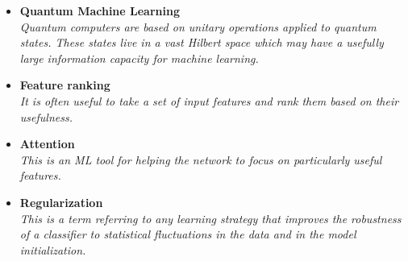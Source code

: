 \documentclass[12pt,letterpaper]{article}
\begin{document}
\begin{itemize}
\begin{itemize}
\begin{itemize}
				\\\textit{Instead of learning to distinguish different types of examples, the goal of reinforcement learning is to learn a strategy (policy).  The prototypical example of reinforcement learning in learning a strategy to play video games using some kind of score as a feedback during the learning.}
				\item \textbf{Quantum Machine Learning}~\cite{Kangaziankangazi:2026xis,Sawaika:2026qxa,Addepalli:2026hwb,Rodrigo:2026atx,Argenton:2026zxr,Knipfer:2026kng,Islam:2026baq,Le:2026xub,Rodrigo:2026xom,Napolitano:2025mhl,MartinezdeLejarzaSamper:2025wuy,Odagiu:2025ifc,Okawa:2025ley,AitHaddou:2025fam,Bal:2025yxb,Maier:2025ppr,Ali:2025gni,Le:2025swl,Pyretzidis:2025stx,Rodriguez-Grasa:2025ggh,Casals:2025cuc,Yin:2025hnt,Le:2025swl,Duffy:2025hsl,Bal:2025ydm,Hammad:2024dsn,Scott:2024txs,Yang:2024bqw,Nelakurti:2024xol,Zhang:2024ebl,Lazar:2024luq,Chen:2024rna,Hoque:2023zjt,Hammad:2023wme,Rehm:2023ovj,Schuhmacher:2023pro,Wozniak:2023xbe,Rousselot:2023pcj,Duckett:2022ccc,Araz:2022zxk,Peixoto:2022zzk,Alvi:2022fkk,Delgado:2022aty,Araz:2022haf,Abel:2022lqr,Gianelle:2022unu,Ngairangbam:2021yma,Kim:2021wrr,Bravo-Prieto:2021ehz,Araz:2021ifk,Belis:2021zqi,Wu:2021xsj,Heredge:2021vww,Blance:2021gcs,Chen:2021ouz,Guan:2020bdl,Wu:2020cye,Chen:2020zkj,Terashi:2020wfi,Blance:2020nhl,Zlokapa:2019lvv,Mott:2017xdb}
				\\\textit{Quantum computers are based on unitary operations applied to quantum states.  These states live in a vast Hilbert space which may have a usefully large information capacity for machine learning.}
				\item \textbf{Feature ranking}~\cite{Das:2022cjl,Grojean:2020ech,Faucett:2020vbu}
				\\\textit{It is often useful to take a set of input features and rank them based on their usefulness.}
				\item \textbf{Attention}~\cite{Renusch:2026tko,Morales:2026qax,VasquezPlaza:2026vjg,Suehara:2026evt,Babicz:2026ljg,Rakib:2026ero,BESIII:2026lqo,Kim:2026rjk,Legge:2025cnm,MozunMateo:2025hkc,Fuks:2025qgh,Wu:2025jza,Esmail:2025kii,Kach:2023rqw,Biassoni:2023lih,Qiu:2023ihi,Finke:2023veq,goto2021development}
				\\\textit{This is an ML tool for helping the network to focus on particularly useful features.}
				\item \textbf{Regularization}~\cite{Drnevich:2025evh,Sforza:2013hua,Araz:2021wqm}
				\\\textit{This is a term referring to any learning strategy that improves the robustness of a classifier to statistical fluctuations in the data and in the model initialization.}

\end{itemize}
\end{itemize}
\end{itemize}
\end{document}
